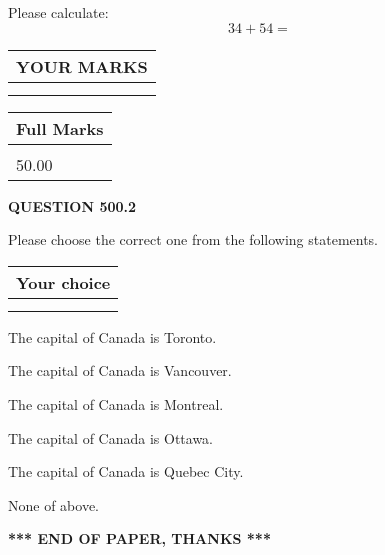 \documentclass[12pt]{article}
\begin{document}
  
 
Please calculate:
\begin{equation}
34 +  %
54 = \nonumber
\end{equation}
 

 

 
  
\vspace{0.2in}
  
\noindent\begin{tabular}{|l|}
\hline
 YOUR MARKS  \\
\hline
 \\ 
 \\ 
\hline
\end{tabular}
\hspace{0.05in} \begin{tabular}{|l|}
\hline
 Full Marks  \\
\hline
 \\ 
50.00 \\
\hline
\end{tabular}
{\textbf{\Large{QUESTION
500.2 
}}}
  
  
Please choose the correct one from the following statements.
  
  
\noindent\hspace{3.0in} \begin{tabular}{|l|}
\hline
Your choice \\
\hline
 \\ 
 \\ 
\hline
\end{tabular}
  
  
 
 
The capital of Canada is Toronto.
 
 
The capital of Canada is Vancouver.
 
 
The capital of Canada is Montreal.
 
 
The capital of Canada is Ottawa.
 
 
The capital of Canada is Quebec City.
 
 
 None of above.
 
 
   
   
 \vspace{0.2in}
 
   
   
   
   
\vspace{1.0in} 
{\textbf{\large{ *** END OF PAPER, THANKS *** }}} 
   
\end{document}
